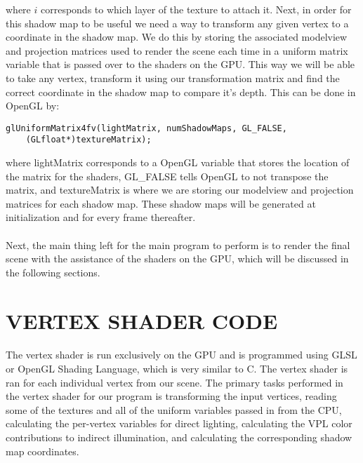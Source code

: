 where $i$ corresponds to which layer of the texture to attach it.  Next, in order for this shadow map to be useful we need a way to transform any given vertex to a coordinate in the shadow map.  We do this by storing the associated modelview and projection matrices used to render the scene each time in a uniform matrix variable that is passed over to the shaders on the GPU.  This way we will be able to take any vertex, transform it using our transformation matrix and find the correct coordinate in the shadow map to compare it's depth.  This can be done in OpenGL by:

\begin{lstlisting}
glUniformMatrix4fv(lightMatrix, numShadowMaps, GL_FALSE, 
	(GLfloat*)textureMatrix);
\end{lstlisting}

where lightMatrix corresponds to a OpenGL variable that stores the location of the matrix for the shaders, GL\_FALSE tells OpenGL to not transpose the matrix, and textureMatrix is where we are storing our modelview and projection matrices for each shadow map.  These shadow maps will be generated at initialization and for every frame thereafter.  

\paragraph{}
Next, the main thing left for the main program to perform is to render the final scene with the assistance of the shaders on the GPU, which will be discussed in the following sections.

\section{VERTEX SHADER CODE}
\paragraph{}
The vertex shader is run exclusively on the GPU and is programmed using GLSL or OpenGL Shading Language, which is very similar to C.  The vertex shader is ran for each individual vertex from our scene.  The primary tasks performed in the vertex shader for our program is transforming the input vertices, reading some of the textures and all of the uniform variables passed in from the CPU, calculating the per-vertex variables for direct lighting, calculating the VPL color contributions to indirect illumination, and calculating the corresponding shadow map coordinates.

